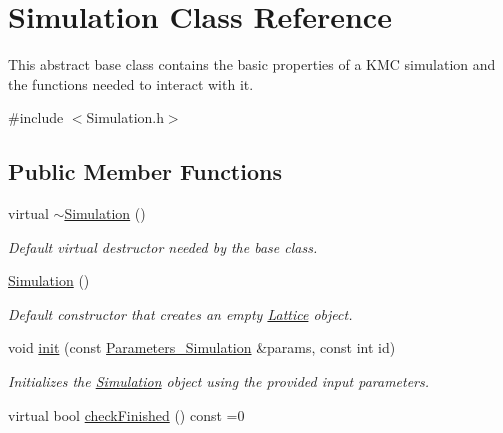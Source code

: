 \hypertarget{class_simulation}{}\section{Simulation Class Reference}
\label{class_simulation}


This abstract base class contains the basic properties of a K\+MC simulation and the functions needed to interact with it.  




{\ttfamily \#include $<$Simulation.\+h$>$}

\subsection*{Public Member Functions}
\begin{DoxyCompactItemize}
\item 
\mbox{\label{class_simulation_a80fad3f57dfaf195a36f7bc49bc88279}} 
virtual \hyperlink{class_simulation_a80fad3f57dfaf195a36f7bc49bc88279}{$\sim$\+Simulation} ()
\begin{DoxyCompactList}\small\item\em Default virtual destructor needed by the base class. \end{DoxyCompactList}\item 
\mbox{\label{class_simulation_a5b224cc5b36bcc8eb29689aff223de41}} 
\hyperlink{class_simulation_a5b224cc5b36bcc8eb29689aff223de41}{Simulation} ()
\begin{DoxyCompactList}\small\item\em Default constructor that creates an empty \hyperlink{class_lattice}{Lattice} object. \end{DoxyCompactList}\item 
void \hyperlink{class_simulation_af88e5e0634b373ba28f1dd87670725a6}{init} (const \hyperlink{struct_parameters___simulation}{Parameters\+\_\+\+Simulation} \&params, const int id)
\begin{DoxyCompactList}\small\item\em Initializes the \hyperlink{class_simulation}{Simulation} object using the provided input parameters. \end{DoxyCompactList}\item 
virtual bool \hyperlink{class_simulation_af69bb46977a3a0084214a194c888e16c}{check\+Finished} () const =0
\item 

\end{DoxyCompactItemize}
